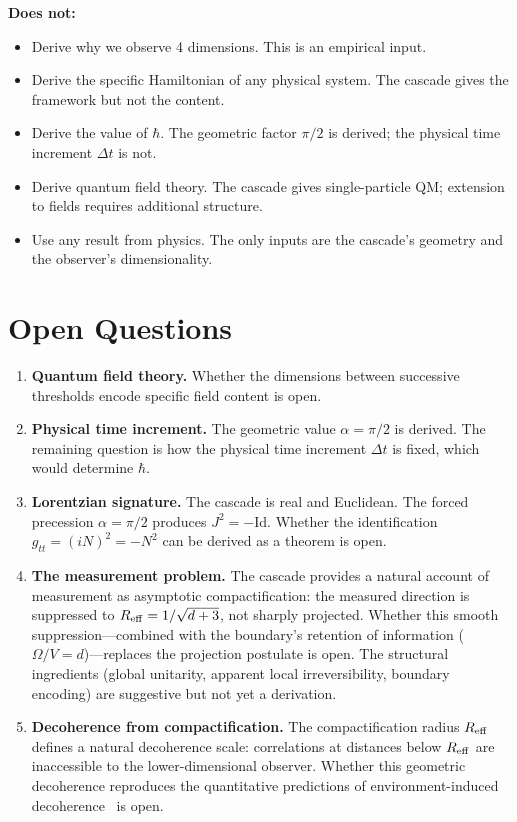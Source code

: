 \documentclass[12pt,a4paper]{article}
\begin{document}
\textbf{Does not:}
\begin{itemize}
\item Derive why we observe 4 dimensions. This is an empirical input.
\item Derive the specific Hamiltonian of any physical system. The cascade gives the
framework but not the content.
\item Derive the value of $\hbar$. The geometric factor $\pi/2$ is derived; the physical
time increment $\Delta t$ is not.
\item Derive quantum field theory. The cascade gives single-particle QM; extension to fields
requires additional structure.
\item Use any result from physics. The only inputs are the cascade's geometry and the
observer's dimensionality.
\end{itemize}

\section{Open Questions}
\label{sec:open}

\begin{enumerate}
\item \textbf{Quantum field theory.} Whether the dimensions between successive thresholds
encode specific field content is open.
\item \textbf{Physical time increment.} The geometric value $\alpha=\pi/2$ is derived. The
remaining question is how the physical time increment $\Delta t$ is fixed, which would
determine $\hbar$.
\item \textbf{Lorentzian signature.} The cascade is real and Euclidean. The forced precession
$\alpha=\pi/2$ produces $J^2=-\mathrm{Id}$. Whether the identification $g_{tt}=(iN)^2=-N^2$
can be derived as a theorem is open.
\item \textbf{The measurement problem.} The cascade provides a natural account of measurement
as asymptotic compactification: the measured direction is suppressed to $R_{\rm eff}=
1/\sqrt{d+3}$, not sharply projected. Whether this smooth suppression---combined with the
boundary's retention of information ($\Omega/V=d$)---replaces the projection postulate is
open. The structural ingredients (global unitarity, apparent local irreversibility, boundary
encoding) are suggestive but not yet a derivation.
\item \textbf{Decoherence from compactification.} The compactification radius $R_{\rm eff}$
defines a natural decoherence scale: correlations at distances below $R_{\rm eff}$ are
inaccessible to the lower-dimensional observer. Whether this geometric decoherence reproduces
the quantitative predictions of environment-induced decoherence~\cite{zurek} is open.
\end{enumerate}
\end{document}
